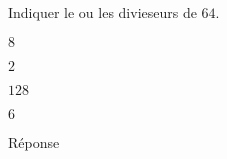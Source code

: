 \begin{exercice}
    Indiquer le ou les divieseurs de $64$.
    \begin{ChoixQCM}{4}
        \item $8$
        \item $2$
        \item $128$
        \item $6$
    \end{ChoixQCM}
\end{exercice}
\begin{corrige}
    Réponse  
\end{corrige}